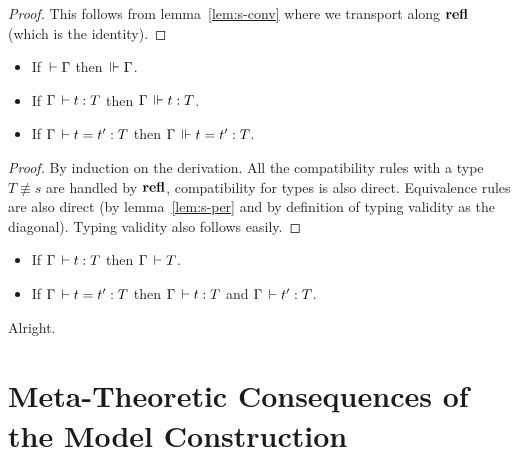 \documentclass[a4paper,english]{lipics-utf8x}
\begin{document}
  \begin{lemma}
    \leavevmode
    \begin{mathc}
    \end{mathc}
  \end{lemma}

  \begin{proof}
    This follows from lemma~\ref{lem:s-conv} where we transport along $\operatorname{\mathbf{refl}}$
    (which is the identity).
  \end{proof}

  \begin{theorem}
    \leavevmode
    \begin{itemize}
      \item If $\,\vdash \Gamma$ then $\,\Vdash \Gamma$.
      \item If $\Gamma \,\vdash t : T$ then $\Gamma \,\Vdash t : T$.
      \item If $\Gamma \,\vdash t = t' : T$ then $\Gamma \,\Vdash t = t' : T$.
    \end{itemize}
  \end{theorem}

  \begin{proof}
    By induction on the derivation.
    All the compatibility rules with a type $T \nequiv s$ are handled by
    $\operatorname{\mathbf{refl}}$, compatibility for types is also direct.
    Equivalence rules are also direct (by lemma~\ref{lem:s-per} and by
    definition of typing validity as the diagonal).
    Typing validity also follows easily.
  \end{proof}

  \begin{corollary}
    \leavevmode
    \begin{itemize}
      \item If $\Gamma \,\vdash t : T$ then $\Gamma \,\vdash T$.
      \item If $\Gamma \,\vdash t = t' : T$ then $\Gamma \,\vdash t : T$ and
      $\Gamma \,\vdash t' : T$.
    \end{itemize}
  \end{corollary}
  Alright.

  \section{Meta-Theoretic Consequences of the Model Construction}
\end{document}
